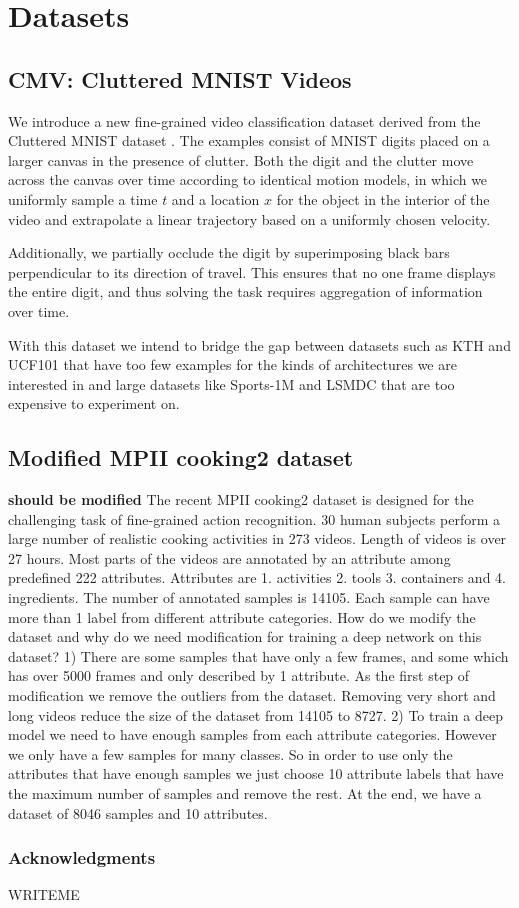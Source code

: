 \documentclass{article} %
\begin{document}
\section{Datasets}
\subsection{CMV: Cluttered MNIST Videos}

We introduce a new fine-grained video classification dataset derived from the Cluttered MNIST dataset \cite{clutteredmnist}.
The examples consist of MNIST digits placed on a larger canvas in the presence of clutter.
Both the digit and the clutter move across the canvas over time according to identical motion models, in which we uniformly sample a time $t$ and a location $x$ for the object in the interior of the video and extrapolate a linear trajectory based on a uniformly chosen velocity.

Additionally, we partially occlude the digit by superimposing black bars perpendicular to its direction of travel.
This ensures that no one frame displays the entire digit, and thus solving the task requires aggregation of information over time.

With this dataset we intend to bridge the gap between datasets such as KTH \cite{kth} and UCF101 \cite{ucf101} that have too few examples for the kinds of architectures we are interested in and large datasets like Sports-1M \cite{sports1m} and LSMDC \cite{lsmdc} that are too expensive to experiment on.

\subsection{Modified MPII cooking2 dataset}
\textbf{should be modified} The recent MPII cooking2 dataset is designed for the challenging task of fine-grained action recognition. 30 human subjects perform a large number of realistic cooking activities in 273 videos. Length of videos is over 27 hours. Most parts of the videos are annotated by an attribute among predefined 222 attributes. Attributes are 1. activities 2. tools 3. containers and 4. ingredients. The number of annotated samples is 14105. Each sample can have more than 1 label from different attribute categories. 
How do we modify the dataset and why do we need modification for training a deep network on this dataset? 
1) There are some samples that have only a few frames, and some which has over 5000 frames and only described by 1 attribute. As the first step of modification we remove the outliers from the dataset. Removing very short and long videos reduce the size of the dataset from 14105 to 8727.
2) To train a deep model we need to have enough samples from each attribute categories. However we only have a few samples for many classes. So in order to use only the attributes that have enough samples we just choose 10 attribute labels that have the maximum number of samples and remove the rest. At the end, we have a dataset of 8046 samples and 10 attributes.
\subsubsection*{Acknowledgments}

WRITEME



\end{document}
